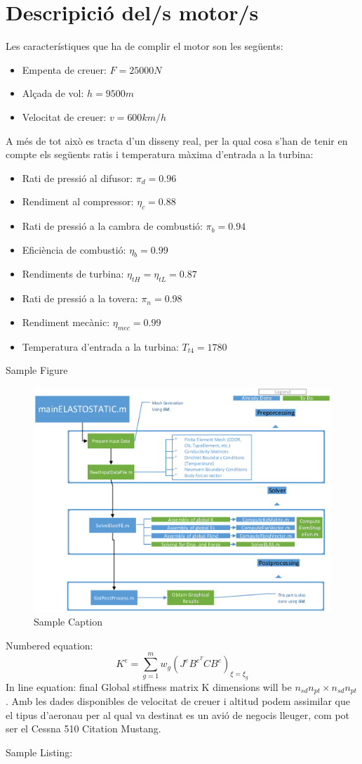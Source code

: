\section{Descripició del/s motor/s}
Les característiques que ha de complir el motor son les següents:
\begin{itemize}
\item Empenta de creuer: $F=25000N$
\item Alçada de vol: $h=9500m$
\item Velocitat de creuer: $v=600km/h$
\end{itemize}
A més de tot això es tracta d'un disseny real, per la qual cosa s'han de tenir en compte els següents ratis i temperatura màxima d'entrada a la turbina:
\begin{itemize}
\item Rati de pressió al difusor: $\pi_d=0.96$
\item Rendiment al compressor: $\eta_c=0.88$
\item Rati de pressió a la cambra de combustió: $\pi_b=0.94$
\item Eficiència de combustió: $\eta_b=0.99$
\item Rendiments de turbina: $\eta_{tH}=\eta_{tL}=0.87$
\item Rati de pressió a la tovera: $\pi_n=0.98$
\item Rendiment mecànic: $\eta_{mec}=0.99$
\item Temperatura d'entrada a la turbina: $T_{t4}=1780$
\end{itemize}
Sample Figure
\begin{figure}[H]
	\centering
	\includegraphics[scale=0.9]{./pics/sample}
	\caption{Sample Caption}
\end{figure}
Numbered equation:
\begin{equation}
	K^e = \sum_{g=1}^{m}w_g (J^eB^{e^T}C B^e)_{\xi=\xi_g}
\end{equation}
In line equation:
final Global stiffness matrix K dimensions will be $n_{sd}n_{pt}\times n_{sd}n_{pt}$.
Amb les dades disponibles de velocitat de creuer i altitud podem assimilar que el tipus d'aeronau per al qual va destinat es un avió de negocis lleuger, com pot ser el Cessna 510 Citation Mustang. 



Sample Listing:

